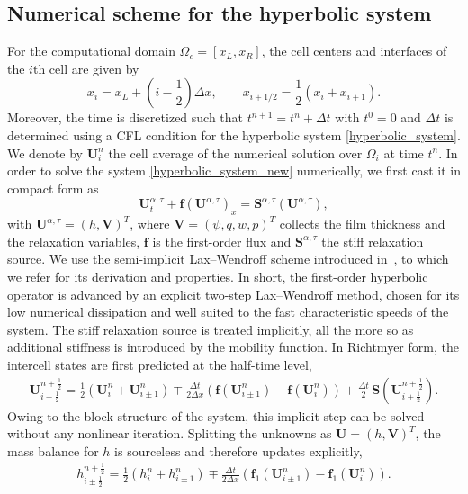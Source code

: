 \documentclass[11pt]{article}
\numberwithin{equation}{section}
\newtheorem{counter example}[theorem]{Counter Example}
\newcommand{\gh}[1]{\left( #1\right)}
\newcommand{\dx}{\Delta x}
\numberwithin{equation}{section}
\numberwithin{equation}{section}
\newcommand{\prn}[1]{\left( #1 \right)}
\newcommand{\hlf}{\frac{1}{2}}
\begin{document}
\subsection{Numerical scheme for the hyperbolic system}
For the computational domain $\Omega_c=[x_L, x_R]$, the cell centers and interfaces of the $i$th cell are given by
\[
x_i = x_L + \gh{i-\frac{1}{2}}\dx, \qquad
x_{i+1/2}=\dfrac{1}{2}(x_i+x_{i+1}).
\]
Moreover, the time is discretized such that $t^{n+1}=t^n+\Delta t$ with $t^0=0$
and $\Delta t$ is determined using a CFL condition for the hyperbolic system
\eqref{hyperbolic_system}. We denote by $\mathbf{U}_i^n$ the cell average of the
numerical solution over $\Omega_i$ at time $t^n$.
In order to solve the system \eqref{hyperbolic_system_new} numerically, we first
cast it in compact form as
\begin{equation}
	\mathbf{U}^{\alpha,\tau}_t + \mathbf{f}(\mathbf{U}^{\alpha,\tau})_x
	= \mathbf{S}^{\alpha,\tau}(\mathbf{U}^{\alpha,\tau}),
	\label{eq:system_numerics}
\end{equation}
with $\mathbf{U}^{\alpha,\tau}=(h,\mathbf{V})^{T}$, where
$\mathbf{V}=(\psi,q,w,p)^{T}$ collects the film thickness and the relaxation
variables, $\mathbf{f}$ is the first-order flux and
$\mathbf{S}^{\alpha,\tau}$ the stiff relaxation source. We use the
semi-implicit Lax--Wendroff scheme introduced in~\cite{barthwal2025relaxation},
to which we refer for its derivation and properties. In short, the first-order
hyperbolic operator is advanced by an explicit two-step Lax--Wendroff method,
chosen for its low numerical dissipation and well suited to the fast
characteristic speeds of the system. The stiff relaxation source is treated
implicitly, all the more so as additional stiffness is introduced by the mobility function. In Richtmyer form, the intercell
states are first predicted at the half-time level,
\begin{align}
	\mathbf{U}_{i\pm\hlf}^{n+\hlf} = \hlf\prn{\mathbf{U}_{i}^n + \mathbf{U}_{i\pm1}^n}
	\mp \frac{\Delta t}{2\Delta x}\prn{\mathbf{f}(\mathbf{U}_{i\pm1}^n)-\mathbf{f}(\mathbf{U}_{i}^n)}
	+ \frac{\Delta t}{2}\,\mathbf{S}\left(\mathbf{U}_{i\pm\hlf}^{n+\hlf}\right).
	\label{eq:LW_step1}
\end{align}
Owing to the block structure of the system, this implicit step can be solved
without any nonlinear iteration. Splitting the unknowns as
$\mathbf{U}=(h,\mathbf{V})^T$, the mass balance for $h$ is sourceless and
therefore updates explicitly,
\begin{align}
	h_{i\pm\hlf}^{n+\hlf} = \hlf\prn{h_{i}^n + h_{i\pm1}^n}
	\mp \frac{\Delta t}{2\Delta x}\prn{\mathbf{f}_1(\mathbf{U}_{i\pm1}^n)-\mathbf{f}_1(\mathbf{U}_{i}^n)}.
	\label{eq:LW_step1_h}
\end{align}
\end{document}
